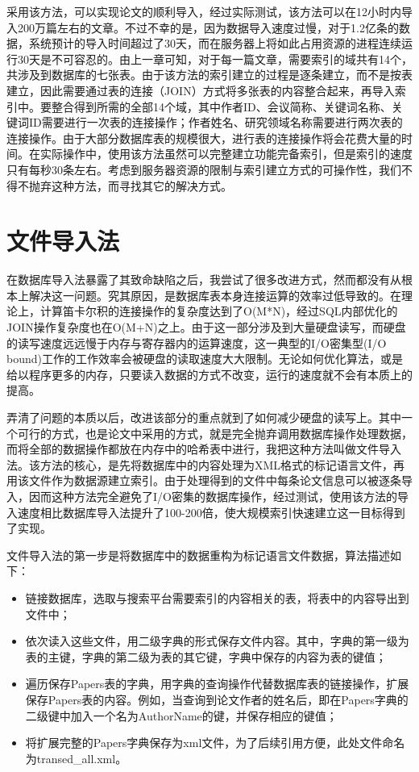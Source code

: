 采用该方法，可以实现论文的顺利导入，经过实际测试，该方法可以在12小时内导入200万篇左右的文章。不过不幸的是，因为数据导入速度过慢，对于1.2亿条的数据，系统预计的导入时间超过了30天，而在服务器上将如此占用资源的进程连续运行30天是不可容忍的。由上一章可知，对于每一篇文章，需要索引的域共有14个，共涉及到数据库的七张表。由于该方法的索引建立的过程是逐条建立，而不是按表建立，因此需要通过表的连接（JOIN）方式将多张表的内容整合起来，再导入索引中。要整合得到所需的全部14个域，其中作者ID、会议简称、关键词名称、关键词ID需要进行一次表的连接操作；作者姓名、研究领域名称需要进行两次表的连接操作。由于大部分数据库表的规模很大，进行表的连接操作将会花费大量的时间。在实际操作中，使用该方法虽然可以完整建立功能完备索引，但是索引的速度只有每秒30条左右。考虑到服务器资源的限制与索引建立方式的可操作性，我们不得不抛弃这种方法，而寻找其它的解决方式。

\section{文件导入法}
在数据库导入法暴露了其致命缺陷之后，我尝试了很多改进方式，然而都没有从根本上解决这一问题。究其原因，是数据库表本身连接运算的效率过低导致的。在理论上，计算笛卡尔积的连接操作的复杂度达到了O(M*N)，经过SQL内部优化的JOIN操作复杂度也在O(M+N)之上。由于这一部分涉及到大量硬盘读写，而硬盘的读写速度远远慢于内存与寄存器内的运算速度，这一典型的I/O密集型(I/O bound)工作的工作效率会被硬盘的读取速度大大限制。无论如何优化算法，或是给以程序更多的内存，只要读入数据的方式不改变，运行的速度就不会有本质上的提高。

弄清了问题的本质以后，改进该部分的重点就到了如何减少硬盘的读写上。其中一个可行的方式，也是论文中采用的方式，就是完全抛弃调用数据库操作处理数据，而将全部的数据操作都放在内存中的哈希表中进行，我把这种方法叫做文件导入法。该方法的核心，是先将数据库中的内容处理为XML格式的标记语言文件，再用该文件作为数据源建立索引。由于处理得到的文件中每条论文信息可以被逐条导入，因而这种方法完全避免了I/O密集的数据库操作，经过测试，使用该方法的导入速度相比数据库导入法提升了100-200倍，使大规模索引快速建立这一目标得到了实现。

文件导入法的第一步是将数据库中的数据重构为标记语言文件数据，算法描述如下：

\begin{itemize}
\item 链接数据库，选取与搜索平台需要索引的内容相关的表，将表中的内容导出到文件中；
\item 依次读入这些文件，用二级字典的形式保存文件内容。其中，字典的第一级为表的主键，字典的第二级为表的其它键，字典中保存的内容为表的键值；
\item 遍历保存Papers表的字典，用字典的查询操作代替数据库表的链接操作，扩展保存Papers表的内容。例如，当查询到论文作者的姓名后，即在Papers字典的二级键中加入一个名为AuthorName的键，并保存相应的键值；
\item 将扩展完整的Papers字典保存为xml文件，为了后续引用方便，此处文件命名为transed\_all.xml。
\end{itemize}

